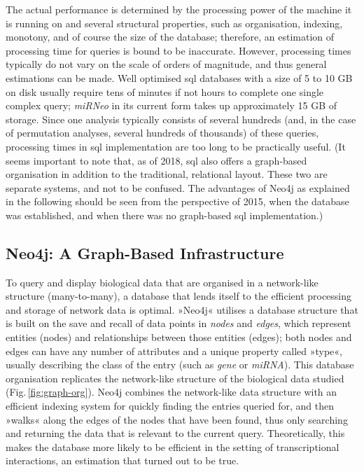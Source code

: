 The actual performance is determined by the processing power of the machine it is running on and several structural properties, such as organisation, indexing, monotony, and of course the size of the database; therefore, an estimation of processing time for queries is bound to be inaccurate. However, processing times typically do not vary on the scale of orders of magnitude, and thus general estimations can be made. Well optimised \ac{sql} databases with a size of 5 to 10 GB on disk usually require tens of minutes if not hours to complete one single complex query;\cite{Chaudhuri2004} \textit{miRNeo} in its current form takes up approximately 15 GB of storage. Since one analysis typically consists of several hundreds (and, in the case of permutation analyses, several hundreds of thousands) of these queries, processing times in \ac{sql} implementation are too long to be practically useful. (It seems important to note that, as of 2018, \ac{sql} also offers a graph-based organisation in addition to the traditional, relational layout. These two are separate systems, and not to be confused. The advantages of Neo4j as explained in the following should be seen from the perspective of 2015, when the database was established, and when there was no graph-based \ac{sql} implementation.)

\subsection{Neo4j: A Graph-Based Infrastructure}
To query and display biological data that are organised in a network-like structure (many-to-many), a database that lends itself to the efficient processing and storage of network data is optimal. »Neo4j« utilises a database structure that is built on the save and recall of data points in \emph{nodes} and \emph{edges}, which represent entities (nodes) and relationships between those entities (edges); both nodes and edges can have any number of attributes and a unique property called »type«, usually describing the class of the entry (such as \emph{gene} or \emph{miRNA}). This database organisation replicates the network-like structure of the biological data studied (Fig.\,\ref{fig:graph-org}). Neo4j combines the network-like data structure with an efficient indexing system for quickly finding the entries queried for, and then »walks« along the edges of the nodes that have been found, thus only searching and returning the data that is relevant to the current query. Theoretically, this makes the database more likely to be efficient in the setting of transcriptional interactions, an estimation that turned out to be true.

